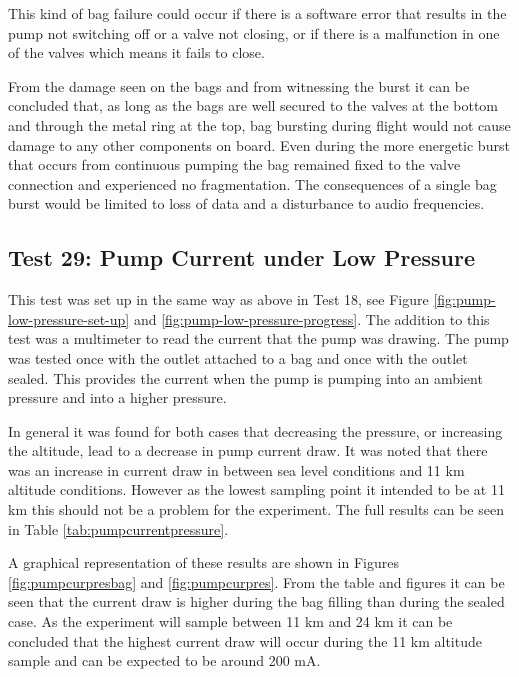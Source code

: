 This kind of bag failure could occur if there is a software error that results in the pump not switching off or a valve not closing, or if there is a malfunction in one of the valves which means it fails to close.

From the damage seen on the bags and from witnessing the burst it can be concluded that, as long as the bags are well secured to the valves at the bottom and through the metal ring at the top, bag bursting during flight would not cause damage to any other components on board. Even during the more energetic burst that occurs from continuous pumping the bag remained fixed to the valve connection and experienced no fragmentation. The consequences of a single bag burst would be limited to loss of data and a disturbance to audio frequencies. 

\subsection{Test 29: Pump Current under Low Pressure}
\label{sec:test29result}

This test was set up in the same way as above in Test 18, see Figure \ref{fig:pump-low-pressure-set-up} and \ref{fig:pump-low-pressure-progress}. The addition to this test was a multimeter to read the current that the pump was drawing. The pump was tested once with the outlet attached to a bag and once with the outlet sealed. This provides the current when the pump is pumping into an ambient pressure and into a higher pressure.

In general it was found for both cases that decreasing the pressure, or increasing the altitude, lead to a decrease in pump current draw. It was noted that there was an increase in current draw in between sea level conditions and 11 km altitude conditions. However as the lowest sampling point it intended to be at 11 km this should not be a problem for the experiment. The full results can be seen in Table \ref{tab:pumpcurrentpressure}. 



A graphical representation of these results are shown in Figures \ref{fig:pumpcurpresbag} and \ref{fig:pumpcurpres}. From the table and figures it can be seen that the current draw is higher during the bag filling than during the sealed case. As the experiment will sample between 11 km and 24 km it can be concluded that the highest current draw will occur during the 11 km altitude sample and can be expected to be around 200 mA. 

